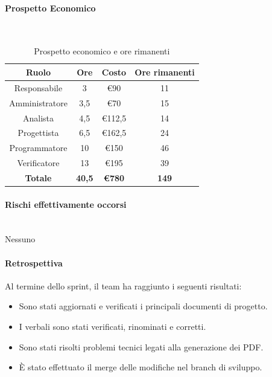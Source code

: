 \documentclass{article}
\begin{document}
                \paragraph{Prospetto Economico}\mbox{}\\
                \begin{table}[H]
                    \centering
                    \begin{tabular}{|c|c|c|c|}
                    \hline
                    \textbf{Ruolo}  & \textbf{Ore}  & \textbf{Costo} & \textbf{Ore rimanenti} \\ \hline
                    Responsabile    & 3             & €90            & 11                     \\ \hline
                    Amministratore  & 3,5           & €70            & 15                   \\ \hline
                    Analista        & 4,5           & €112,5          & 14                   \\ \hline
                    Progettista     & 6,5           & €162,5         & 24                   \\ \hline
                    Programmatore   & 10            & €150           & 46                     \\ \hline
                    Verificatore    & 13            & €195           & 39                     \\ \hline
                    \textbf{Totale} & \textbf{40,5} & \textbf{\euro780}   & \textbf{149}         \\ \hline
                    \end{tabular}
                    \caption{Prospetto economico e ore rimanenti}
                \end{table}


                \paragraph{Rischi effettivamente occorsi}\mbox{}\\
                Nessuno

                \paragraph{Retrospettiva}
                Al termine dello sprint, il team ha raggiunto i seguenti risultati:
                \begin{itemize}
                    \item Sono stati aggiornati e verificati i principali documenti di progetto.
                    \item I verbali sono stati verificati, rinominati e corretti.
                    \item Sono stati risolti problemi tecnici legati alla generazione dei PDF.
                    \item È stato effettuato il merge delle modifiche nel branch di sviluppo.
                \end{itemize}
                
\end{document}
